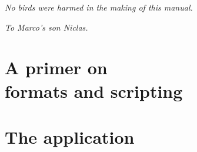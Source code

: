 \documentclass[a4paper,oneside,12pt]{memoir}
\begin{document}
\vspace*{25em}

\begin{flushright}
\em No birds were harmed in the making of this manual.
\end{flushright}






\cleardoublepage

\vspace*{25em}

\begin{flushright}
\em To Marco's son Niclas.
\end{flushright}

\cleardoublepage

\tableofcontents*

\cleardoublepage

%


\mainmatter

\part[A primer on formats and scripting]{A primer on\\ formats and scripting}
\label{part:primer}




\part{The application}
\label{part:application}





\end{document}

